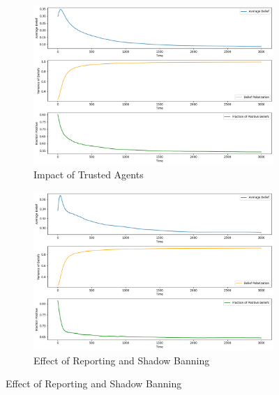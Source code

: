 \documentclass[a4paper,11pt]{scrartcl}
\begin{document}
\begin{figure}[H]
    \begin{subfigure}[b]{0.45\textwidth}
        \centering
        \includegraphics[width=\textwidth]{./images/task4_2.png}
        \caption{Impact of Trusted Agents}
        \label{fig:task4_2}
    \end{subfigure}
     \hfill 
    \begin{subfigure}[b]{0.45\textwidth}
        \centering
        \includegraphics[width=\textwidth]{./images/task4_3.png}
        \caption{Effect of Reporting and Shadow Banning}
        \label{fig:task4_3}
    \end{subfigure}
    
    \vspace{0.5cm}


\end{figure}
\end{document}
